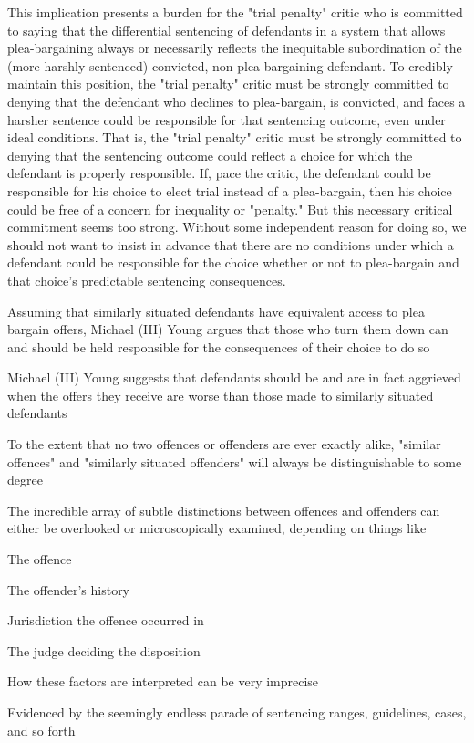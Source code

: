 This implication presents a burden for the "trial penalty" critic who is committed to saying that the differential sentencing of defendants in a system that allows plea-bargaining always or necessarily reflects the inequitable subordination of the (more harshly sentenced) convicted, non-plea-bargaining defendant. To credibly maintain this position, the "trial penalty" critic must be strongly committed to denying that the defendant who declines to plea-bargain, is convicted, and faces a harsher sentence could be responsible for that sentencing outcome, even under ideal conditions. That is, the "trial penalty" critic must be strongly committed to denying that the sentencing outcome could reflect a choice for which the defendant is properly responsible. If, pace the critic, the defendant could be responsible for his choice to elect trial instead of a plea-bargain, then his choice could be free of a concern for inequality or "penalty." But this necessary critical commitment seems too strong. Without some independent reason for doing so, we should not want to insist in advance that there are no conditions under which a defendant could be responsible for the choice whether or not to plea-bargain and that choice's predictable sentencing consequences.

Assuming that similarly situated defendants have equivalent access to plea bargain offers, Michael (III) Young argues that those who turn them down can and should be held responsible for the consequences of their choice to do so

Michael (III) Young suggests that defendants should be and are in fact aggrieved when the offers they receive are worse than those made to similarly situated defendants

To the extent that no two offences or offenders are ever exactly alike, "similar offences" and "similarly  situated offenders" will always be distinguishable to some degree

The incredible array of subtle distinctions between offences and offenders can either be overlooked or microscopically examined, depending on things like

The offence

The offender's history

Jurisdiction the offence occurred in

The judge deciding the disposition

How these factors are interpreted can be very imprecise

Evidenced by the seemingly endless parade of sentencing ranges, guidelines, cases, and so forth


